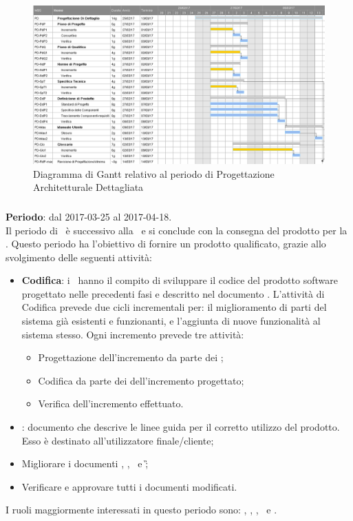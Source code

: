 		\begin{figure}[ht]
			\centering
			\includegraphics[scale=0.35]{img/ganttnetbreak3.png}
			\caption{Diagramma di Gantt relativo al periodo di Progettazione Architetturale Dettagliata}
		\end{figure}
		\FloatBarrier
		
		\subsubsection{\CO}
		\textbf{Periodo}: dal 2017-03-25 al 2017-04-18.\\
		Il periodo di \CO\ è successivo alla \PD\ e si conclude con la consegna	del prodotto per la \RQ. Questo periodo ha l'obiettivo di fornire un prodotto qualificato, grazie allo svolgimento delle seguenti attività:
		\begin{itemize}
			\item \textbf{Codifica}: i \textit{\Progrs}\ hanno il compito di sviluppare il codice del prodotto software progettato nelle precedenti fasi e descritto nel documento \DDP. L’attività di Codifica prevede due cicli incrementali per: il miglioramento
			di parti del sistema già esistenti e funzionanti, e l’aggiunta di nuove funzionalità al sistema stesso.
			Ogni incremento prevede tre attività:
			\begin{itemize}
				\item Progettazione dell’incremento da parte dei \textit{\Progs};
				\item Codifica da parte dei \textit{\Progrs} dell’incremento progettato;
				\item Verifica dell’incremento effettuato.
			\end{itemize}
			\item \textit{\MU}: documento che descrive le linee guida per il corretto utilizzo del prodotto. Esso è destinato all’utilizzatore finale/cliente;
			\item  Migliorare i documenti \NdP, \PdP, \PdQ\ e \G;
			\item Verificare e approvare tutti i documenti modificati.
		\end{itemize}
		I ruoli maggiormente interessati in questo periodo sono: \textit{\Amm}, \textit{\Res}, \textit{\Prog}, \textit{\Progr}\ e \textit{\Ver}.
		
